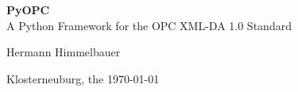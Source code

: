 %
%

\begin{titlepage}
\mbox{}
\vspace{0.2cm}
\begin{center}
\vspace{2cm}
\begin{large}
{\bf PyOPC}\\ 
\vspace{0.2cm}
A Python Framework for the OPC XML-DA 1.0 Standard \\
\end{large}
\vspace{1cm}
Hermann Himmelbauer\\
\end{center}
\vspace{1cm}
Klosterneuburg, the \today
\end{titlepage}
